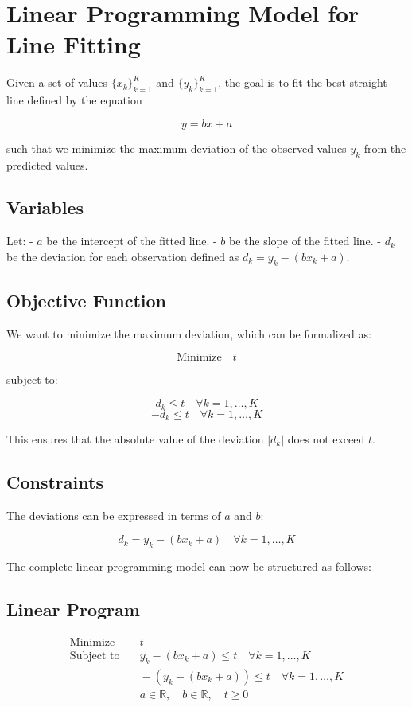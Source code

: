 \documentclass{article}
\begin{document}
\section*{Linear Programming Model for Line Fitting}

Given a set of values \( \{x_k\}_{k=1}^K \) and \( \{y_k\}_{k=1}^K \), the goal is to fit the best straight line defined by the equation 

\[
y = bx + a
\]

such that we minimize the maximum deviation of the observed values \( y_k \) from the predicted values.

\subsection*{Variables}
Let:
- \( a \) be the intercept of the fitted line.
- \( b \) be the slope of the fitted line.
- \( d_k \) be the deviation for each observation defined as \( d_k = y_k - (bx_k + a) \).

\subsection*{Objective Function}
We want to minimize the maximum deviation, which can be formalized as:

\[
\text{Minimize} \quad t
\]

subject to:

\[
d_k \leq t \quad \forall k = 1, \ldots, K
\]
\[
-d_k \leq t \quad \forall k = 1, \ldots, K
\]

This ensures that the absolute value of the deviation \( |d_k| \) does not exceed \( t \).

\subsection*{Constraints}
The deviations can be expressed in terms of \( a \) and \( b \):

\[
d_k = y_k - (bx_k + a) \quad \forall k = 1, \ldots, K
\]

The complete linear programming model can now be structured as follows:

\subsection*{Linear Program}
\begin{align*}
\text{Minimize} & \quad t \\
\text{Subject to} & \quad y_k - (bx_k + a) \leq t \quad \forall k = 1, \ldots, K \\
                  & \quad -(y_k - (bx_k + a)) \leq t \quad \forall k = 1, \ldots, K \\
                  & \quad a \in \mathbb{R}, \quad b \in \mathbb{R}, \quad t \geq 0
\end{align*}
\end{document}
